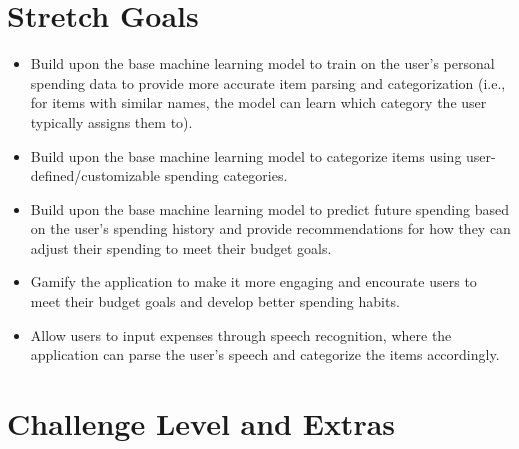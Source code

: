 \documentclass{article}
\begin{document}
\section{Stretch Goals}
\begin{itemize}
    \item Build upon the base machine learning model to train on the user's
    personal spending data to provide more accurate item parsing and
    categorization (i.e., for items with similar names, the model can learn
    which category the user typically assigns them to).
    \item Build upon the base machine learning model to categorize items using
    user-defined/customizable spending categories.
    \item Build upon the base machine learning model to predict future spending
    based on the user's spending history and provide recommendations for how
    they can adjust their spending to meet their budget goals.
    \item Gamify the application to make it more engaging and encourate users to
    meet their budget goals and develop better spending habits.
    \item Allow users to input expenses through speech recognition, where the
    application can parse the user's speech and categorize the items
    accordingly.
\end{itemize}

\section{Challenge Level and Extras}


\end{document}
